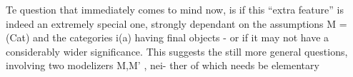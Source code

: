 Te question that immediately \hand{\unsure{$\smile$}}comes to mind now, is if this ``extra
feature'' is indeed an extremely special one, strongly dependant on the
assumptions M = (Cat) and the categories i(a) having final objects -
or if it may not have a considerably wider significance. This suggests
the still more general questions, involving two modelizers M,M' , nei-%
ther of which needs be elementary 

